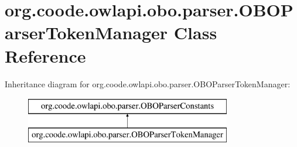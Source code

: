 \hypertarget{classorg_1_1coode_1_1owlapi_1_1obo_1_1parser_1_1_o_b_o_parser_token_manager}{\section{org.\-coode.\-owlapi.\-obo.\-parser.\-O\-B\-O\-Parser\-Token\-Manager Class Reference}
\label{classorg_1_1coode_1_1owlapi_1_1obo_1_1parser_1_1_o_b_o_parser_token_manager}
}
Inheritance diagram for org.\-coode.\-owlapi.\-obo.\-parser.\-O\-B\-O\-Parser\-Token\-Manager\-:\begin{figure}[H]
\begin{center}
\leavevmode
\includegraphics[height=2.000000cm]{classorg_1_1coode_1_1owlapi_1_1obo_1_1parser_1_1_o_b_o_parser_token_manager}
\end{center}
\end{figure}
